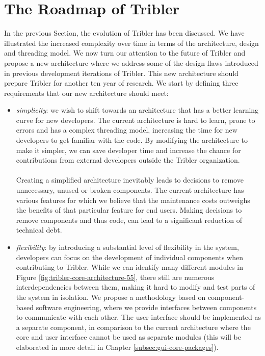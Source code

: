 \section{The Roadmap of Tribler}
\label{sec:tribler-roadmap}
In the previous Section, the evolution of Tribler has been discussed. We have illustrated the increased complexity over time in terms of the architecture, design and threading model. We now turn our attention to the future of Tribler and propose a new architecture where we address some of the design flaws introduced in previous development iterations of Tribler. This new architecture should prepare Tribler for another ten year of research. We start by defining three requirements that our new architecture should meet:
\begin{itemize}
	\item \emph{simplicity}: we wish to shift towards an architecture that has a better learning curve for new developers. The current architecture is hard to learn, prone to errors and has a complex threading model, increasing the time for new developers to get familiar with the code. By modifying the architecture to make it simpler, we can save developer time and increase the chance for contributions from external developers outside the Tribler organization.\\\\
	Creating a simplified architecture inevitably leads to decisions to remove unnecessary, unused or broken components. The current architecture has various features for which we believe that the maintenance costs outweighs the benefits of that particular feature for end users. Making decisions to remove components and thus code, can lead to a significant reduction of technical debt.
	\item \emph{flexibility}: by introducing a substantial level of flexibility in the system, developers can focus on the development of individual components when contributing to Tribler. While we can identify many different modules in Figure \ref{fig:tribler-core-architecture-55}, there still are numerous interdependencies between them, making it hard to modify and test parts of the system in isolation. We propose a methodology based on component-based software engineering, where we provide interfaces between components to communicate with each other. The user interface should be implemented as a separate component, in comparison to the current architecture where the core and user interface cannot be used as separate modules (this will be elaborated in more detail in Chapter \ref{subsec:gui-core-packages}).

\end{itemize}
